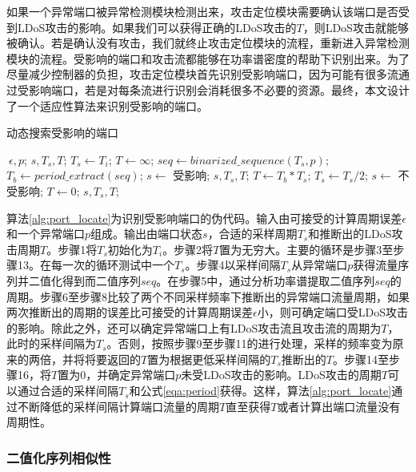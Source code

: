 如果一个异常端口被异常检测模块检测出来，攻击定位模块需要确认该端口是否受到LDoS攻击的影响。如果我们可以获得正确的LDoS攻击的$T$，则LDoS攻击就能够被确认。若是确认没有攻击，我们就终止攻击定位模块的流程，重新进入异常检测模块的流程。受影响的端口和攻击流都能够在功率谱密度的帮助下识别出来。为了尽量减少控制器的负担，攻击定位模块首先识别受影响端口，因为可能有很多流通过受影响端口，若是对每条流进行识别会消耗很多不必要的资源。最终，本文设计了一个适应性算法来识别受影响的端口。

\begin{algorithm}[H]
	\caption{动态搜索受影响的端口}
	\label{alg:port_locate}
	\begin{algorithmic}[1]
		\Require $~{\epsilon}, p$;
		\Ensure $s, T_s, T$;
		\State $T_s \gets T_i$;
		\State $T \gets \infty$; 
		\State $seq \gets binarized\_sequence(T_s, p)$;
		\State $T_b \gets period\_extract(seq)$;
		\State $s \gets$ 受影响;
		\State \Return $s, T_s, T$;
		\Else
		\State $T \gets T_b * T_s$;
		\State $T_s \gets T_s / 2$;
		\EndIf 
		\EndWhile
		\State $s \gets$ 不受影响;
		\State $T \gets 0$; 
		\State \Return $s, T_s, T$;
	\end{algorithmic}
\end{algorithm}

算法\ref{alg:port_locate}为识别受影响端口的伪代码。输入由可接受的计算周期误差$\epsilon$和一个异常端口$p$组成。输出由端口状态$s$，合适的采样周期$T_s$和推断出的LDoS攻击周期$T$。步骤1将$T_s$初始化为$T_i$。步骤2将$T$置为无穷大。主要的循环是步骤3至步骤13。在每一次的循环测试中一个$T_s$。步骤4以采样间隔$T_s$从异常端口$p$获得流量序列并二值化得到而二值序列$seq$。在步骤5中，通过分析功率谱提取二值序列$seq$的周期。步骤6至步骤8比较了两个不同采样频率下推断出的异常端口流量周期，如果两次推断出的周期的误差比可接受的计算周期误差$\epsilon$小，则可确定端口受LDoS攻击的影响。除此之外，还可以确定异常端口上有LDoS攻击流且攻击流的周期为$T$，此时的采样间隔为$T_s$。否则，按照步骤9至步骤11的进行处理，采样的频率变为原来的两倍，并将将要返回的$T$置为根据更低采样间隔的$T_s$推断出的$T$。步骤14至步骤16，将$T$置为0，并确定异常端口$p$未受LDoS攻击的影响。LDoS攻击的周期$T$可以通过合适的采样间隔$T_s$和公式\ref{eqa:period}获得。这样，算法\ref{alg:port_locate}通过不断降低的采样间隔计算端口流量的周期$T$直至获得$T$或者计算出端口流量没有周期性。

\subsubsection{二值化序列相似性}
\label{chap4:seq-similarity}

